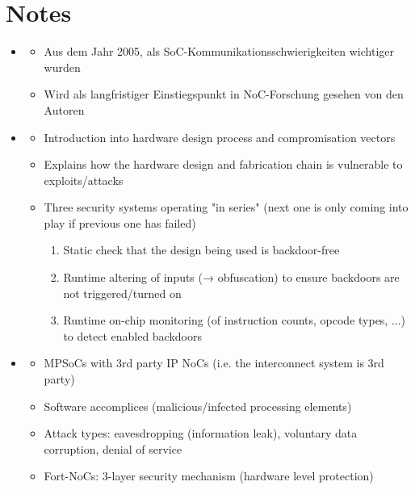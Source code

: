 \section{Notes}
\begin{itemize}
    \item \textbf{} \checkmark
        \begin{itemize}
            \item Aus dem Jahr 2005, als SoC-Kommunikationsschwierigkeiten wichtiger wurden
            \item Wird als langfristiger Einstiegspunkt in NoC-Forschung gesehen von den Autoren
        \end{itemize}
    \item \textbf{} \checkmark
        \begin{itemize}
            \item Introduction into hardware design process and compromisation vectors
            \item Explains how the hardware design and fabrication chain is vulnerable to exploits/attacks
            \item Three security systems operating "in series" (next one is only coming into play if previous one has failed)
                \begin{enumerate}
                    \item Static check that the design being used is backdoor-free
                    \item Runtime altering of inputs (→ obfuscation) to ensure backdoors are not triggered/turned on
                    \item Runtime on-chip monitoring (of instruction counts, opcode types, ...) to detect enabled backdoors
                \end{enumerate}
        \end{itemize}
    \item \textbf{} \checkmark
        \begin{itemize}
            \item MPSoCs with 3rd party IP NoCs (i.e. the interconnect system is 3rd party)
            \item Software accomplices (malicious/infected processing elements)
            \item Attack types: eavesdropping (information leak), voluntary data corruption, denial of service
            \item Fort-NoCs: 3-layer security mechanism (hardware level protection)

\end{itemize}
\end{itemize}
